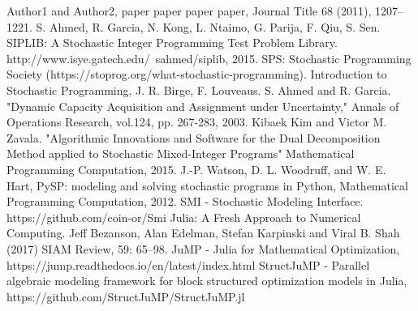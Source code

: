 \begin{thebibliography}{9} 
	Author1 and Author2, paper paper paper paper, Journal Title 68 (2011), 1207--1221.
	S. Ahmed, R. Garcia, N. Kong, L. Ntaimo, G. Parija, F. Qiu, S. Sen. SIPLIB: A Stochastic Integer Programming Test Problem Library. http://www.isye.gatech.edu/~sahmed/siplib, 2015.
	SPS: Stochastic Programming Society (https://stoprog.org/what-stochastic-programming).
	Introduction to Stochastic Programming, J. R. Birge, F. Louveaus.
	S. Ahmed and R. Garcia. "Dynamic Capacity Acquisition and Assignment under Uncertainty," Annals of Operations Research, vol.124, pp. 267-283, 2003.
	Kibaek Kim and Victor M. Zavala. "Algorithmic Innovations and Software for the Dual Decomposition Method applied to Stochastic Mixed-Integer Programs" Mathematical Programming Computation, 2015.
	J.-P. Watson, D. L. Woodruff, and W. E. Hart, PySP: modeling and solving stochastic programs in Python, Mathematical Programming Computation, 2012.
	SMI - Stochastic Modeling Interface. https://github.com/coin-or/Smi
	Julia: A Fresh Approach to Numerical Computing. Jeff Bezanson, Alan Edelman, Stefan Karpinski and Viral B. Shah (2017) SIAM Review, 59: 65–98.
	JuMP - Julia for Mathematical Optimization, https://jump.readthedocs.io/en/latest/index.html
	StructJuMP - Parallel algebraic modeling framework for block structured optimization models in Julia, https://github.com/StructJuMP/StructJuMP.jl
\end{thebibliography}


